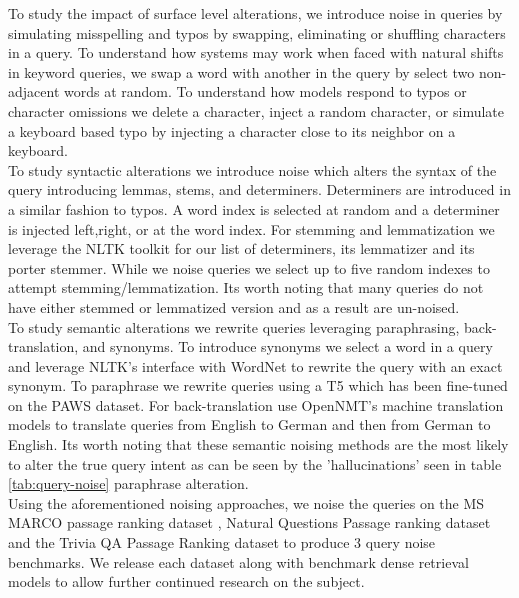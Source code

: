 To study the impact of surface level alterations, we introduce noise in queries by simulating misspelling and typos by swapping, eliminating or shuffling characters in a query. To understand how systems may work when faced with natural shifts in keyword queries, we swap a word with another in the query by select two non-adjacent words at random. To understand how models respond to typos or character omissions we delete a character, inject a random character, or simulate a keyboard based typo by injecting a character close to its neighbor on a keyboard. \\ 
To study syntactic alterations we introduce noise which alters the syntax of the query introducing lemmas, stems, and determiners. Determiners are introduced in a similar fashion to typos. A word index is selected at random and a determiner is injected left,right, or at the word index. For stemming and lemmatization we leverage the NLTK toolkit \cite{bird2009natural} for our list of determiners, its lemmatizer and its porter stemmer. While we noise queries we select up to five random indexes to attempt stemming/lemmatization. Its worth noting that many queries do not have either stemmed or lemmatized version and as a result are un-noised. \\
To study semantic alterations we rewrite queries leveraging paraphrasing, back-translation, and synonyms. To introduce synonyms we select a word in a query and leverage NLTK's interface with WordNet \cite{Fellbaum2000WordNetA} to rewrite the query with an exact synonym. To paraphrase we rewrite queries using a T5 \cite{Raffel2020ExploringT} which has been fine-tuned on the PAWS \cite{Zhang2019PAWSPA} dataset. For back-translation use OpenNMT's \cite{klein-etal-2017-opennmt} machine translation models to translate queries from English to German and then from German to English. Its worth noting that these semantic noising methods are the most likely to alter the true query intent as can be seen by the 'hallucinations' seen in table \ref{tab:query-noise} paraphrase alteration. \\
Using the aforementioned noising approaches, we noise the queries on the MS MARCO passage ranking dataset \cite{Campos2016MSMA}, Natural Questions Passage ranking dataset \cite{Kwiatkowski2019NaturalQA} and the Trivia QA Passage Ranking dataset \cite{Joshi2017TriviaQAAL} to produce 3 query noise benchmarks. We release each dataset along with benchmark dense retrieval models to allow further  continued research on the subject. \\
